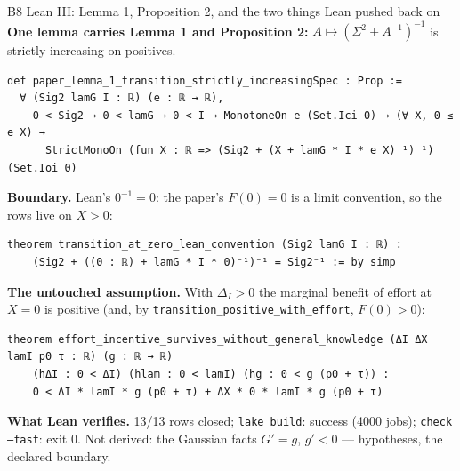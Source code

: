 \documentclass[aspectratio=169,11pt]{beamer}
\begin{document}
\begin{frame}[fragile]{B8 \textperiodcentered{} Lean III: Lemma 1, Proposition 2, and the two things Lean pushed back on}
  \small\textbf{One lemma carries Lemma 1 and Proposition 2:} $A\mapsto(\Sigma^2+A^{-1})^{-1}$ is strictly increasing on positives.
\begin{lstlisting}
def paper_lemma_1_transition_strictly_increasingSpec : Prop :=
  ∀ (Sig2 lamG I : ℝ) (e : ℝ → ℝ),
    0 < Sig2 → 0 < lamG → 0 < I → MonotoneOn e (Set.Ici 0) → (∀ X, 0 ≤ e X) →
      StrictMonoOn (fun X : ℝ => (Sig2 + (X + lamG * I * e X)⁻¹)⁻¹) (Set.Ioi 0)
\end{lstlisting}
  \textbf{Boundary.} Lean's $0^{-1}=0$: the paper's $F(0)=0$ is a limit convention, so the rows live on $X>0$:
\begin{lstlisting}
theorem transition_at_zero_lean_convention (Sig2 lamG I : ℝ) :
    (Sig2 + ((0 : ℝ) + lamG * I * 0)⁻¹)⁻¹ = Sig2⁻¹ := by simp
\end{lstlisting}
  \textbf{The untouched assumption.} With $\Delta_I>0$ the marginal benefit of effort at $X=0$ is positive
  (and, by \texttt{transition\_positive\_with\_effort}, $F(0)>0$):
\begin{lstlisting}
theorem effort_incentive_survives_without_general_knowledge (ΔI ΔX lamI p0 τ : ℝ) (g : ℝ → ℝ)
    (hΔI : 0 < ΔI) (hlam : 0 < lamI) (hg : 0 < g (p0 + τ)) :
    0 < ΔI * lamI * g (p0 + τ) + ΔX * 0 * lamI * g (p0 + τ)
\end{lstlisting}
  \textbf{What Lean verifies.} 13/13 rows closed; \texttt{lake build}: success (4000 jobs); \texttt{check --fast}: exit 0.
  Not derived: the Gaussian facts $G'=g$, $g'<0$ --- hypotheses, the declared boundary.
\end{frame}
\end{document}

